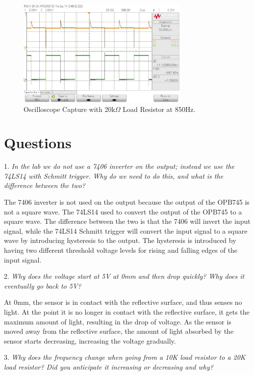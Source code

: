 \documentclass[CMPE]{KGCOEReport}
\begin{document}
\begin{figure}[H]
    \centering
    \includegraphics[width=0.75\textwidth]{output_max_20.png}
    \caption{Oscilloscope Capture with 20k$\Omega$ Load Resistor at 850Hz.}
    \label{fig:osc_20_max}
\end{figure}

\section*{Questions}

1. \emph{In the lab we do not use a 7406 inverter on the output; instead we use the 74LS14 with Schmitt trigger. Why do we need to do this, and what is the difference between the two?}

The 7406 inverter is not used on the output because the output of the OPB745 is not a square wave. The 74LS14 used to convert the output of the OPB745 to a square wave. The difference between the two is that the 7406 will invert the input signal, while the 74LS14 Schmitt trigger will convert the input signal to a square wave by introducing hysteresis to the output. The hysteresis is introduced by having two different threshold voltage levels for rising and falling edges of the input signal.
\bigskip

2. \emph{Why does the voltage start at 5V at 0mm and then drop quickly? Why does it eventually go back to 5V?}

At 0mm, the sensor is in contact with the reflective surface, and thus senses no light. At the point it is no longer in contact with the reflective surface, it gets the maximum amount of light, resulting in the drop of voltage. As the sensor is moved away from the reflective surface, the amount of light absorbed by the sensor starts decreasing, increasing the voltage gradually.
\bigskip

3. \emph{Why does the frequency change when going from a 10K load resistor to a 20K load resistor? Did you anticipate it increasing or decreasing and why?}
\end{document}
